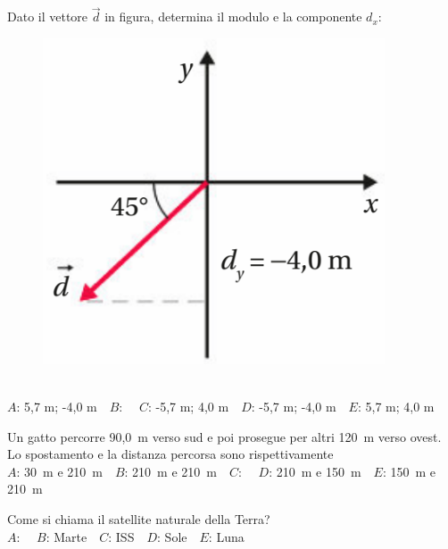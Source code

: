 \mcquestionfooter



\def\mcquestionnumber{11}


\mcquestionheader Dato il vettore $\vec{d}$ in figura, determina il modulo e la componente $d_x$: \begin{figure}[h!]   \begin{center}     \includegraphics[scale=0.35]{vettored.png}   \end{center} \end{figure}\\
{$A$}: 5,7 m; -4,0 m\ \ {$B$}: \ \ {$C$}: -5,7 m; 4,0 m\ \ {$D$}: -5,7 m; -4,0 m\ \ {$E$}: 5,7 m; 4,0 m\ \ 

\mcquestionfooter



\def\mcquestionnumber{12}


\mcquestionheader Un gatto percorre 90,0~m verso sud e poi prosegue per altri 120~m verso ovest. Lo spostamento e la distanza percorsa sono rispettivamente\\
{$A$}: 30~m e 210~m\ \ {$B$}: 210~m e 210~m\ \ {$C$}: \ \ {$D$}: 210~m e 150~m\ \ {$E$}: 150~m e 210~m\ \ 

\mcquestionfooter



\mcpaperfooter

\def\mcserialnumber{26}
\mcpaperheader


\def\mcquestionnumber{1}


\mcquestionheader Come si chiama il satellite naturale della Terra?\\
{$A$}: \ \ {$B$}: Marte\ \ {$C$}: ISS\ \ {$D$}: Sole\ \ {$E$}: Luna\ \ 

